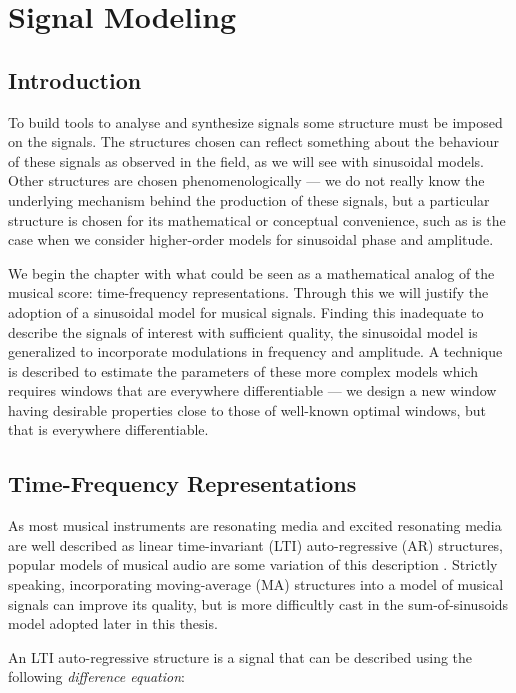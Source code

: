 \chapter{Signal Modeling\label{chap:sigmod}}

\section{Introduction}

To build tools to analyse and synthesize signals some structure must be imposed
on the signals. The structures chosen can reflect something about the behaviour
of these signals as observed in the field, as we will see with sinusoidal
models. Other structures are chosen phenomenologically --- we do not really know
the underlying mechanism behind the production of these signals, but a
particular structure is chosen for its mathematical or conceptual convenience,
such as is the case when we consider higher-order models for sinusoidal phase
and amplitude.

We begin the chapter with what could be seen as a mathematical analog of the
musical score: time-frequency representations. Through this we will justify the
adoption of a sinusoidal model for musical signals. Finding this inadequate to
describe the signals of interest with sufficient quality, the sinusoidal model
is generalized to incorporate modulations in frequency and amplitude. A
technique is described to estimate the parameters of these more complex models
which requires windows that are everywhere differentiable --- we design a new
window having desirable properties close to those of well-known optimal windows,
but that is everywhere differentiable.

\section{Time-Frequency Representations \label{sec:timefreqrep}}

As most musical instruments are resonating media and excited resonating media
are well described as linear time-invariant (LTI) auto-regressive (AR)
structures, popular models of musical audio are some variation of this
description \cite{fletcher2012physics}. Strictly speaking, incorporating
moving-average (MA) structures into a model of musical signals can improve its
quality, but is more difficultly cast in the sum-of-sinusoids model adopted
later in this thesis.

An LTI auto-regressive structure is a signal that can be described using the
following \textit{difference equation}:

